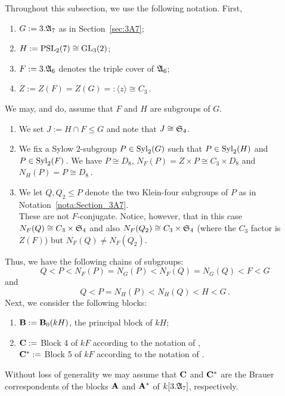 \begin{nota}\label{nota:Section_3A6}%
Throughout this subsection, we use the following notation. First, 
\begin{enumerate}[label=(\arabic*)]
    \item $G:=3.{\mathfrak{A}}_7$ as in Section~\ref{sec:3A7}; 
    \item $H:=\operatorname{PSL}_2(7)\cong\operatorname{GL}_3(2)$;
    \item $F:=3.{\mathfrak{A}}_6$ denotes the triple cover of ${\mathfrak{A}}_6$;
    \item $Z:=Z(F)=Z(G)=:\langle z\rangle\cong C_3$\,.
\end{enumerate}
We may, and do, assume that $F$ and $H$ are subgroups of $G$. 
\begin{enumerate}[label=(\arabic*), start=5]  
    \item We set $J:= H\cap F\leq G$ and note that $J\cong {\mathfrak{S}}_4$.
    \item We fix a Sylow $2$-subgroup $P\in \operatorname{Syl}_2(G)$ such that $P\in\operatorname{Syl}_2(H)$ and
    $P\in\operatorname{Syl}_2(F)$\,. 
    We have $P\cong D_8$, $N_F(P)=Z\times P\cong C_3\times D_8$ and $N_H(P)=P\cong D_8$\,.
    \item We let $Q,Q_2\leq P$ denote the two   Klein-four subgroups of $P$ as in Notation~\ref{nota:Section_3A7}.\\
    These are not $F$-conjugate. 
    Notice, however, that in this case $N_F(Q)\cong C_3\times {\mathfrak{S}}_4$ and also $N_F(Q_2)\cong C_3\times {\mathfrak{S}}_4$ (where the $C_3$ factor is $Z(F)$) but $N_F(Q)\neq N_F(Q_2)$.   
\end{enumerate}
Thus, we have the following chains of subgroups:
 $$Q< P < N_F(P)=N_{G}(P)< N_F(Q)=N_{G}(Q)< F< G$$
 and 
 \[
 Q< P=N_H(P)< N_H(Q)< H< G\,.
 \]
Next, we consider the following blocks: 
\begin{enumerate}[label=(\arabic*), start=8] 
    \item\label{nota:3A6_B0(kH)} ${\mathbf{B}}:={\mathbf{B}}_0(kH)$, the principal block of $kH$;
    \item ${\mathbf{C}}:=$ Block 4 of $kF$ according to the notation of \cite[A6mod2]{ModularAtlas},\\
    ${\mathbf{C}}^{\ast}:=$ Block 5 of $kF$ according to the notation of \cite[A6mod2]{ModularAtlas}. 
\end{enumerate} 
Without loss of generality we may assume that ${\mathbf{C}}$ and ${\mathbf{C}}^\ast$ are the Brauer correspondents of the blocks ${\mathbf{A}}$ and ${\mathbf{A}}^\ast$ of $k[3.{\mathfrak{A}}_7]$, respectively. 

\end{nota}
